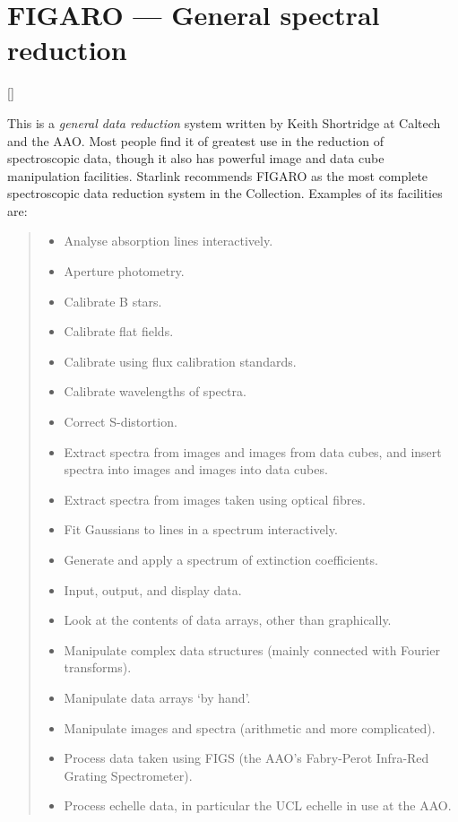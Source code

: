 \newpage

\section{FIGARO --- General spectral reduction}

\vspace{-11mm}

\hfill []

\vspace{5mm}

This is a {\em general data reduction} system written by Keith Shortridge at
Caltech and the AAO.
Most people find it of greatest use in the reduction of spectroscopic data,
though it also has powerful image and data cube manipulation facilities.
Starlink recommends FIGARO as the most complete spectroscopic data reduction
system in the Collection.
Examples of its facilities are:

{\small
\begin{quote}
\begin{itemize}
\item Analyse absorption lines interactively.
\item Aperture photometry.
\item Calibrate B stars.
\item Calibrate flat fields.
\item Calibrate using flux calibration standards.
\item Calibrate wavelengths of spectra.
\item Correct S-distortion.
\item Extract spectra from images and images from data cubes, and insert
 spectra into images and images into data cubes.
\item Extract spectra from images taken using optical fibres.
\item Fit Gaussians to lines in a spectrum interactively.
\item Generate and apply a spectrum of extinction coefficients.
\item Input, output, and display data.
\item Look at the contents of data arrays, other than graphically.
\item Manipulate complex data structures (mainly connected with Fourier
 transforms).
\item Manipulate data arrays `by hand'.
\item Manipulate images and spectra (arithmetic and more complicated).
\item Process data taken using FIGS (the AAO's Fabry-Perot Infra-Red Grating
Spectrometer).
\item Process echelle data, in particular the UCL echelle in use at the AAO.
\end{itemize}
\end{quote}
}

